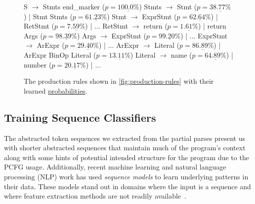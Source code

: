 \begin{figure}[t]
\begin{rules}
S        $\rightarrow$ Stmts end_marker ($p = \underline{100.0\%}$)
Stmts    $\rightarrow$ Stmt \n ($p = \underline{38.77\%}$) | Stmt \n Stmts ($p = \underline{61.23\%}$)
Stmt     $\rightarrow$ ExprStmt ($p = \underline{62.64\%}$) | RetStmt ($p = \underline{ 7.59\%}$) | ...
RetStmt  $\rightarrow$ return ($p = \underline{ 1.61\%}$) | return Args ($p = \underline{98.39\%}$)
Args     $\rightarrow$ ExprStmt ($p = \underline{99.20\%}$) | ...
ExprStmt $\rightarrow$ ArExpr ($p = \underline{29.40\%}$) | ...
ArExpr   $\rightarrow$ Literal ($p = \underline{86.89\%}$) | ArExpr BinOp Literal ($p = \underline{13.11\%}$)
Literal  $\rightarrow$ name ($p = \underline{64.89\%}$) | number ($p = \underline{20.17\%}$) | ...
\end{rules}
\caption{The production rules shown in \autoref{fig:production-rules} with
their learned \underline{probabilities}.}
\label{fig:weighted-production-rules}
\end{figure}

\subsection{Training Sequence Classifiers}
\label{sec:overview:train}
The abstracted token sequences we extracted from the partial parses present us
with shorter abstracted sequences that maintain much of the program's context
along with some hints of potential intended structure for the program due to the
PCFG usage. Additionally, recent machine learning and
natural language processing (NLP) \citep{Sutskever_2014, Hardalov_2018}
work has used \emph{sequence models} to learn underlying patterns in their data.
These models stand out in domains where the input is a sequence and where feature
extraction methods are not readily available~\citep{Sutskever_2014}.

